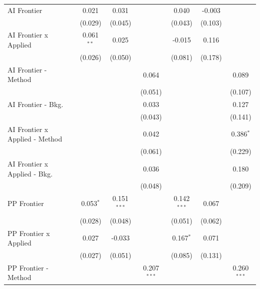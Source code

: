 \begin{tabular}{lcccccc}
   AI Frontier                    & 0.021          & 0.031         &               & 0.040          & -0.003  &   \\   
                                  & (0.029)        & (0.045)       &               & (0.043)        & (0.103) &   \\   
   AI Frontier x Applied          & 0.061$^{**}$   & 0.025         &               & -0.015         & 0.116   &   \\   
                                  & (0.026)        & (0.050)       &               & (0.081)        & (0.178) &   \\   
   AI Frontier - Method           &                &               & 0.064         &                &         & 0.089\\   
                                  &                &               & (0.051)       &                &         & (0.107)\\   
   AI Frontier - Bkg.             &                &               & 0.033         &                &         & 0.127\\   
                                  &                &               & (0.043)       &                &         & (0.141)\\   
   AI Frontier x Applied - Method &                &               & 0.042         &                &         & 0.386$^{*}$\\   
                                  &                &               & (0.061)       &                &         & (0.229)\\   
   AI Frontier x Applied - Bkg.   &                &               & 0.036         &                &         & 0.180\\   
                                  &                &               & (0.048)       &                &         & (0.209)\\   
   PP Frontier                    & 0.053$^{*}$    & 0.151$^{***}$ &               & 0.142$^{***}$  & 0.067   &   \\   
                                  & (0.028)        & (0.048)       &               & (0.051)        & (0.062) &   \\   
   PP Frontier x Applied          & 0.027          & -0.033        &               & 0.167$^{*}$    & 0.071   &   \\   
                                  & (0.027)        & (0.051)       &               & (0.085)        & (0.131) &   \\   
   PP Frontier - Method           &                &               & 0.207$^{***}$ &                &         & 0.260$^{***}$\\   

\end{tabular}
